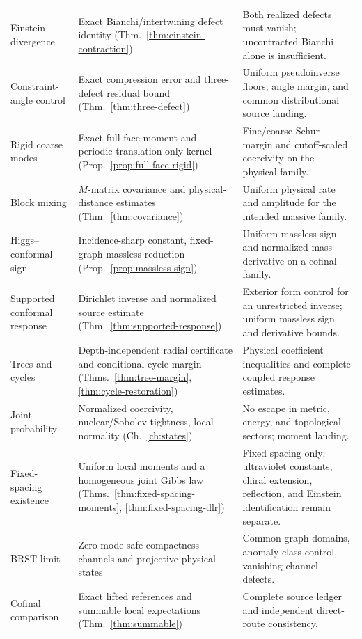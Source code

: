 \documentclass[11pt,a4paper,oneside]{book}
\theoremstyle{plain}
\theoremstyle{definition}
\theoremstyle{remark}
\begin{document}
\begin{longtable}{@{}>{\raggedright\arraybackslash}p{}>{\raggedright\arraybackslash}p{}>{\raggedright\arraybackslash}p{}@{}}
Einstein divergence & Exact Bianchi/intertwining defect identity (Thm.~\ref{thm:einstein-contraction}) & Both realized defects must vanish; uncontracted Bianchi alone is insufficient.\\[1pt]
Constraint-angle control & Exact compression error and three-defect residual bound (Thm.~\ref{thm:three-defect}) & Uniform pseudoinverse floors, angle margin, and common distributional source landing.\\[1pt]
Rigid coarse modes & Exact full-face moment and periodic translation-only kernel (Prop.~\ref{prop:full-face-rigid}) & Fine/coarse Schur margin and cutoff-scaled coercivity on the physical family.\\[1pt]
Block mixing & $M$-matrix covariance and physical-distance estimates (Thm.~\ref{thm:covariance}) & Uniform physical rate and amplitude for the intended massive family.\\[1pt]
Higgs--conformal sign & Incidence-sharp constant, fixed-graph massless reduction (Prop.~\ref{prop:massless-sign}) & Uniform massless sign and normalized mass derivative on a cofinal family.\\[1pt]
Supported conformal response & Dirichlet inverse and normalized source estimate (Thm.~\ref{thm:supported-response}) & Exterior form control for an unrestricted inverse; uniform massless sign and derivative bounds.\\[1pt]
Trees and cycles & Depth-independent radial certificate and conditional cycle margin (Thms.~\ref{thm:tree-margin}, \ref{thm:cycle-restoration}) & Physical coefficient inequalities and complete coupled response estimates.\\[1pt]
Joint probability & Normalized coercivity, nuclear/Sobolev tightness, local normality (Ch.~\ref{ch:states}) & No escape in metric, energy, and topological sectors; moment landing.\\[1pt]
Fixed-spacing existence & Uniform local moments and a homogeneous joint Gibbs law (Thms.~\ref{thm:fixed-spacing-moments}, \ref{thm:fixed-spacing-dlr}) & Fixed spacing only; ultraviolet constants, chiral extension, reflection, and Einstein identification remain separate.\\[1pt]
BRST limit & Zero-mode-safe compactness channels and projective physical states & Common graph domains, anomaly-class control, vanishing channel defects.\\[1pt]
Cofinal comparison & Exact lifted references and summable local expectations (Thm.~\ref{thm:summable}) & Complete source ledger and independent direct-route consistency.\\[1pt]

\end{longtable}
\end{document}
